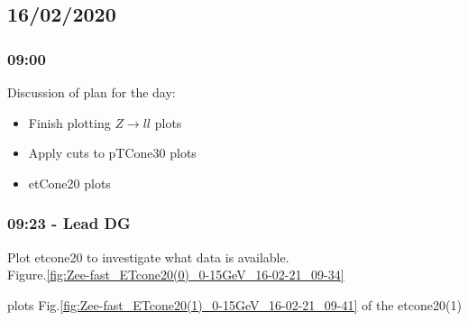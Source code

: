 

\subsection*{\textbf{16/02/2020}}
\subsubsection*{\textbf{09:00}}
Discussion of plan for the day:
\begin{itemize}
    \item Finish plotting $Z \rightarrow ll$ plots
    \item Apply cuts to pTCone30 plots
    \item etCone20 plots
\end{itemize}

\subsubsection*{09:23 - Lead DG}
Plot etcone20 to investigate what data is available.
\\
Figure.\ref{fig:Zee-fast_ETcone20(0)_0-15GeV_16-02-21_09-34}


plots Fig.\ref{fig:Zee-fast_ETcone20(1)_0-15GeV_16-02-21_09-41} of the etcone20(1)

